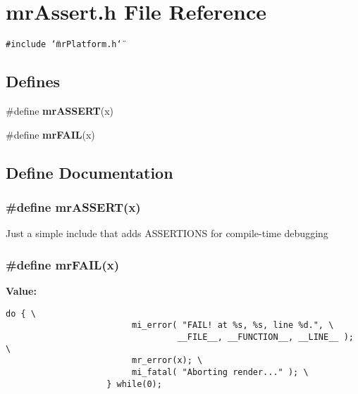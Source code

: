 \section{mr\-Assert.h File Reference}
\label{mrAssert_8h}
{\tt \#include \char`\"{}mr\-Platform.h\char`\"{}}\par
\subsection*{Defines}
\begin{CompactItemize}
\item 
\#define {\bf mr\-ASSERT}(x)
\item 
\#define {\bf mr\-FAIL}(x)
\end{CompactItemize}


\subsection{Define Documentation}
\subsubsection{\setlength{\rightskip}{0pt plus 5cm}\#define mr\-ASSERT(x)}\label{mrAssert_8h_a0}


Just a simple include that adds ASSERTIONS for compile-time debugging 
\subsubsection{\setlength{\rightskip}{0pt plus 5cm}\#define mr\-FAIL(x)}\label{mrAssert_8h_a1}


{\bf Value:}

\footnotesize\begin{verbatim}do { \
                         mi_error( "FAIL! at %s, %s, line %d.", \
                                  __FILE__, __FUNCTION__, __LINE__ ); \
                         mr_error(x); \
                         mi_fatal( "Aborting render..." ); \
                    } while(0);
\end{verbatim}\normalsize 

